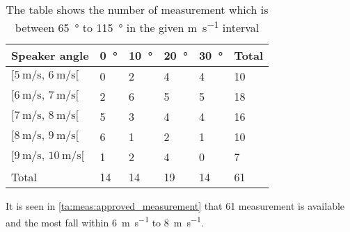 \begin{table}[H]
\centering
\caption{The table shows the number of measurement which is between \SI{65}{\degree} to \SI{115}{\degree} in the given \si{\meter\per\second} interval}
\begin{tabular}{l|l|l|l|l|l}
Speaker angle & \SI{0}{\degree}  & \SI{10}{\degree} & \SI{20}{\degree} & \SI{30}{\degree} & Total \\ \hline
$[\SI{5}{\meter\per\second},\, \SI{6}{\meter\per\second}[ $         & 0  & 2  & 4  & 4  & 10    \\
$[\SI{6}{\meter\per\second},\, \SI{7}{\meter\per\second}[$           & 2  & 6  & 5  & 5  & 18    \\
$[\SI{7}{\meter\per\second},\, \SI{8}{\meter\per\second}[ $          & 5  & 3  & 4  & 4  & 16    \\
$[\SI{8}{\meter\per\second},\, \SI{9}{\meter\per\second}[ $          & 6  & 1  & 2  & 1  & 10    \\
$[\SI{9}{\meter\per\second},\, \SI{10}{\meter\per\second}[  $        & 1  & 2  & 4  & 0  & 7     \\ \hline
Total         & 14 & 14 & 19 & 14 &   61   
\end{tabular}
\label{ta:meas:approved_measurement}
\end{table}

It is seen in \autoref{ta:meas:approved_measurement} that 61 measurement is available and the most fall within \SI{6}{\meter\per\second} to \SI{8}{\meter\per\second}.

